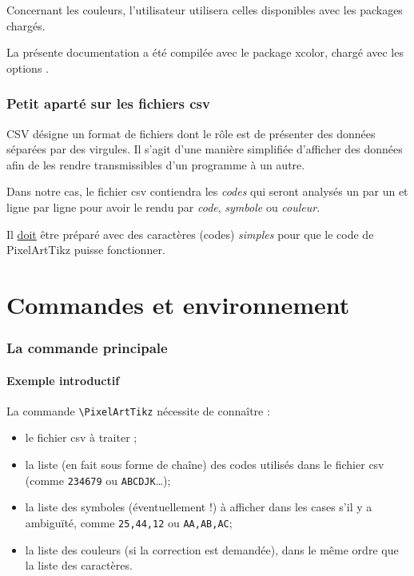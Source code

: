 \documentclass{article}
\newcommand\Cle[1]{{\bfseries\sffamily\textlangle #1\textrangle}}
\begin{document}
Concernant les couleurs, l'utilisateur utilisera celles disponibles avec les packages chargés.

\smallskip

La présente documentation a été compilée avec le package \textsf{xcolor}, chargé avec les options \Cle{[table,svgnames]}.

\section{Petit aparté sur les fichiers csv}

\textsf{CSV} désigne un format de fichiers dont le rôle est de présenter des données séparées par des virgules. Il s'agit d'une manière simplifiée d'afficher des données afin de les rendre transmissibles d'un programme à un autre.

\smallskip

Dans notre cas, le fichier \textsf{csv} contiendra les \textit{codes} qui seront analysés un par un et ligne par ligne pour avoir le rendu par \textit{code}, \textit{symbole} ou \textit{couleur}.

\medskip

Il \underline{doit} être préparé avec des caractères (codes) \textit{simples} pour que le code de \textsf{PixelArtTikz} puisse fonctionner.

\pagebreak

\part{Commandes et environnement}

\section{La commande principale}

\subsection{Exemple introductif}

La commande \texttt{\textbackslash PixelArtTikz} nécessite de connaître :

\begin{itemize}
	\item le fichier \textsf{csv} à traiter ;
	\item la liste (en fait sous forme de chaîne) des codes utilisés dans le fichier \textsf{csv} (comme \texttt{234679} ou \texttt{ABCDJK}\ldots);
	\item la liste des symboles (éventuellement !) à afficher dans les cases s'il y a ambiguïté, comme \texttt{25,44,12} ou \texttt{AA,AB,AC};
	\item la liste des couleurs (si la correction est demandée), dans le même ordre que la liste des caractères.
\end{itemize}
\end{document}
